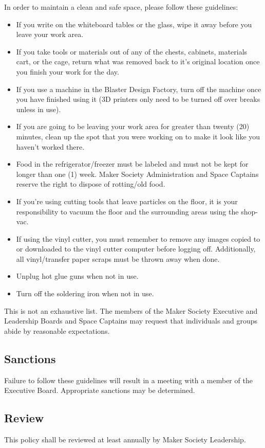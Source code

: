 \documentclass[12pt,letterpaper]{article}
\begin{document}
In order to maintain a clean and safe space, please follow these guidelines:
\begin{itemize}
    \item If you write on the whiteboard tables or the glass, wipe it away before you leave your work area.
    \item If you take tools or materials out of any of the chests, cabinets, materials cart, or the cage, return what was removed back to it’s original location once you finish your work for the day.
    \item If you use a machine in the Blaster Design Factory, turn off the machine once you have finished using it (3D printers only need to be turned off over breaks unless in use).
    \item If you are going to be leaving your work area for greater than twenty (20) minutes, clean up the spot that you were working on to make it look like you haven’t worked there. 
    \item Food in the refrigerator/freezer must be labeled and must not be kept for longer than one (1) week. Maker Society Administration and Space Captains reserve the right to dispose of rotting/old food.
    \item If you’re using cutting tools that leave particles on the floor, it is your responsibility to vacuum the floor and the surrounding areas using the shop-vac.
    \item If using the vinyl cutter, you must remember to remove any images copied to or downloaded to the vinyl cutter computer before logging off. Additionally, all vinyl/transfer paper scraps must be thrown away when done.
    \item Unplug hot glue guns when not in use.
    \item Turn off the soldering iron when not in use.
\end{itemize}

This is not an exhaustive list. The members of the Maker Society Executive and Leadership Boards and Space Captains may request that individuals and groups abide by reasonable expectations.


\subsection{Sanctions}

Failure to follow these guidelines will result in a meeting with a member of the Executive Board. Appropriate sanctions may be determined.

\subsection{Review}

This policy shall be reviewed at least annually by Maker Society Leadership.








    
\end{document}
